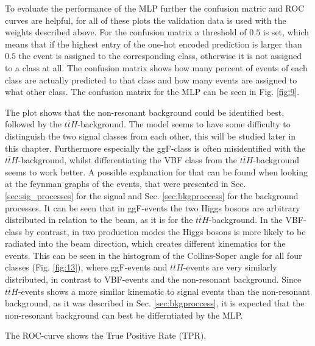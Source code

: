 To evaluate the performance of the MLP further the confusion matric and ROC curves are helpful, for all of these plots the validation data is used with the weights described above.
For the confusion matrix a threshold of $0.5$ is set, which means that if the highest entry
of the one-hot encoded prediction is larger than $0.5$ the event is assigned to the corresponding class, otherwise it is not assigned to a class at all. The confusion matrix shows
how many percent of events of each class are actually predicted to that class and how many events are assigned to what other class. The confusion matrix for the MLP can be seen in Fig. \ref{fig:9}.


The plot shows that the non-resonant background could be identified best, followed by the $t \bar{t} H$-background. The model seems to have some difficulty to distinguish
the two signal classes from each other, this will be studied later in this chapter. Furthermore especially the ggF-class is often misidentified with the $t \bar{t}H$-background, whilst differentiating the VBF class from the $t \bar{t}H$-background seems to work better.
A possible explanation for that can be found when looking at the feynman graphs of the events, that were presented in Sec. \ref{sec:sig_processes} for the signal and Sec. \ref{sec:bkgproccess} for the background processes. It can be seen that in ggF-events the two Higgs bosons are arbitrary distributed in relation to the beam, as it is for the $t \bar{t}H$-background.
In the VBF-class by contrast, in two production modes the Higgs bosons is more likely to be radiated into the beam direction, which creates different kinematics for the events. This can be seen in the histogram of the Collins-Soper angle for all four classes (Fig. \ref{fig:13}), where ggF-events
and $t \bar{t} H$-events are very similarly distributed, in contrast to VBF-events and the non-resonant background.
Since $t \bar{t} H$-events shows a more similar kinematic to signal events than the non-resonant background, as it was described in Sec. \ref{sec:bkgproccess}, it is expected
that the non-resonant background can best be differntiated by the MLP.\\ 


The ROC-curve shows the True Positive Rate (TPR),

